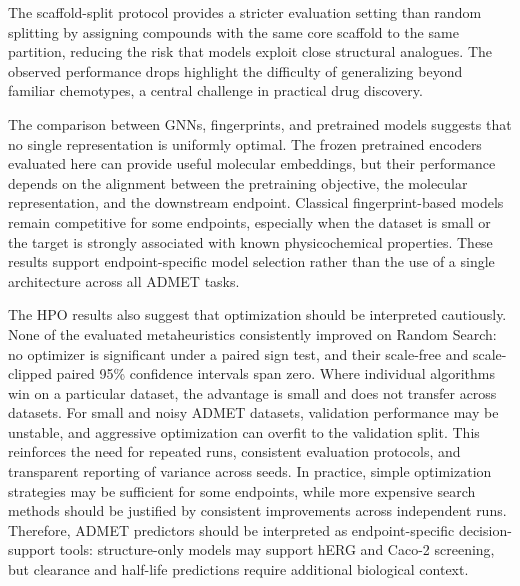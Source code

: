 \documentclass[journal]{IEEEtran}
\begin{document}
The scaffold-split protocol provides a stricter evaluation setting than random splitting by assigning compounds with the same core scaffold to the same partition, reducing the risk that models exploit close structural analogues. The observed performance drops highlight the difficulty of generalizing beyond familiar chemotypes, a central challenge in practical drug discovery.

The comparison between GNNs, fingerprints, and pretrained models suggests that no single representation is uniformly optimal. The frozen pretrained encoders evaluated here can provide useful molecular embeddings, but their performance depends on the alignment between the pretraining objective, the molecular representation, and the downstream endpoint. Classical fingerprint-based models remain competitive for some endpoints, especially when the dataset is small or the target is strongly associated with known physicochemical properties. These results support endpoint-specific model selection rather than the use of a single architecture across all ADMET tasks.

The HPO results also suggest that optimization should be interpreted cautiously. None of the evaluated metaheuristics consistently improved on Random Search: no optimizer is significant under a paired sign test, and their scale-free and scale-clipped paired 95\% confidence intervals span zero. Where individual algorithms win on a particular dataset, the advantage is small and does not transfer across datasets. For small and noisy ADMET datasets, validation performance may be unstable, and aggressive optimization can overfit to the validation split. This reinforces the need for repeated runs, consistent evaluation protocols, and transparent reporting of variance across seeds. In practice, simple optimization strategies may be sufficient for some endpoints, while more expensive search methods should be justified by consistent improvements across independent runs. Therefore, ADMET predictors should be interpreted as endpoint-specific decision-support tools: structure-only models may support hERG and Caco-2 screening, but clearance and half-life predictions require additional biological context.
\end{document}
